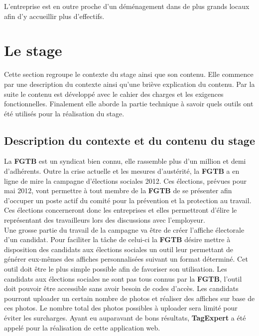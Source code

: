 \documentclass{article}
\begin{document}
\begin{sffamily}
L'entreprise est en outre proche d'un déménagement dans de plus grands locaux afin d'y accueillir plus d'effectifs.

\section{Le stage}

Cette section regroupe le contexte du stage ainsi que son contenu. Elle commence par une description du contexte ainsi qu'une briève explication du contenu. Par la suite le 
contenu est développé avec le cahier des charges et les exigences fonctionnelles. Finalement elle aborde la partie technique à savoir quels outils ont été utilisés pour la 
réalisation du stage.

\subsection{Description du contexte et du contenu du stage}

La \textbf{FGTB} est un syndicat bien connu, elle rassemble plus d'un million et demi d'adhérents. Outre la crise actuelle et les mesures d'austérité, la \textbf{FGTB} a en 
ligne de mire la campagne d'élections sociales 2012. Ces élections, prévues pour mai 2012, vont permettre à tout membre de la \textbf{FGTB} de se présenter afin d'occuper un 
poste actif du comité pour la prévention et la protection au travail. Ces élections concerneront donc les entreprises et elles permettront d'élire le représentant des 
travailleurs lors des discussions avec l'employeur. \\

Une grosse partie du travail de la campagne va être de créer l'affiche électorale d'un candidat. Pour faciliter la tâche de celui-ci la \textbf{FGTB} désire mettre à 
disposition des candidats aux élections sociales un outil leur permettant de générer eux-mêmes des affiches personnalisées suivant un format déterminé. Cet outil doit être 
le plus simple possible afin de favoriser son utilisation. Les candidats aux élections sociales ne sont pas tous connus par la \textbf{FGTB}, l’outil doit pouvoir être
accessible sans avoir besoin de codes d’accès. Les candidats pourront uploader un certain nombre de photos et réaliser des affiches sur base de ces photos. Le nombre total 
des photos possibles à uploader sera limité pour éviter les surcharges. Ayant eu auparavant de bons résultats, \textbf{TagExpert} a été appelé pour la réalisation de cette 
application web. \\


\end{sffamily}
\end{document}
